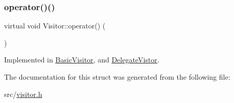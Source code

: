 \mbox{\label{struct_visitor_ab6afd14c23c1fa6f01d24e2593ac91bf}} 
\subsubsection{\texorpdfstring{operator()()}{operator()()}\hspace{0.1cm}{\footnotesize\ttfamily [60/60]}}
{\footnotesize\ttfamily virtual void Visitor\+::operator() (\begin{DoxyParamCaption}\item[{const \hyperlink{struct_program_declaration}{Program\+Declaration} \&}]{ }\end{DoxyParamCaption})\hspace{0.3cm}{\ttfamily [pure virtual]}}



Implemented in \hyperlink{struct_basic_visitor_a365071938626ac065ac413ba0e6d382f}{Basic\+Visitor}, and \hyperlink{struct_delegate_vistor_af8a064f7e3fd7f974f6daece692f3685}{Delegate\+Vistor}.



The documentation for this struct was generated from the following file\+:\begin{DoxyCompactItemize}
\item 
src/\hyperlink{visitor_8h}{visitor.\+h}\end{DoxyCompactItemize}

